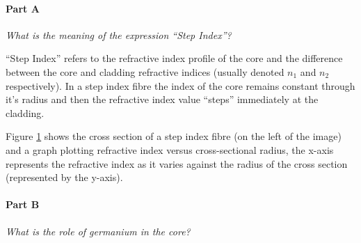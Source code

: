 \documentclass[colorlinks,11pt,a4paper,normalphoto,withhyper,ragged2e]{altareport}
\begin{document}
\paragraph{Part A \linebreak}
\textit{What is the meaning of the expression ``Step Index''?} \linebreak



\begin{paracol}{2}

``Step Index'' refers to the refractive index profile of the core and the difference between the core and cladding refractive indices (usually denoted $n_1$ and $n_2$ respectively). In a step index fibre the index of the core remains constant through it's radius and then the refractive index value ``steps'' immediately at the cladding.

Figure \ref{fig:fibre_index_profile} shows the cross section of a step index fibre (on the left of the image) and a graph plotting refractive index versus cross-sectional radius, the x-axis represents the refractive index as it varies against the radius of the cross section (represented by the y-axis).


\switchcolumn

\begin{figure}[h]
	\centering
	\scalebox{0.4}{}
	
    \caption{}

    \label{fig:fibre_index_profile}
\end{figure}

\end{paracol}




\paragraph{Part B \linebreak}
\textit{What is the role of germanium in the core?} \linebreak
\end{document}
